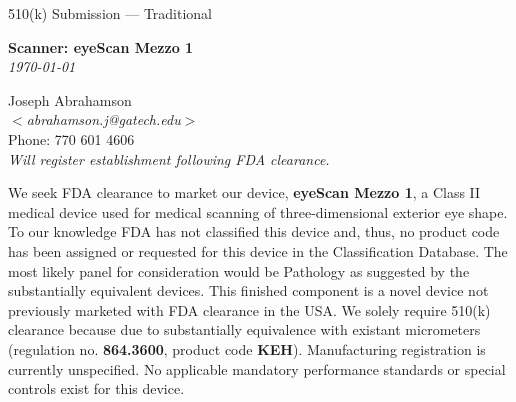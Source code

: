 \newpage
\singlespacing

\begin{flushright}
  \huge{510(k) Submission --- Traditional}\\[.5in]
  
  \begin{minipage}{0.8\textwidth}
    \begin{flushright}
      \large \textbf{Scanner: eyeScan Mezzo 1} \\
      \textit{\today}
    \end{flushright}
  \end{minipage}
\end{flushright}

\begin{flushleft}
  Joseph Abrahamson\\
  $<$\textit{abrahamson.j@gatech.edu}$>$ \\
  Phone: 770 601 4606 \\[1em]
  
  \textit{Will register establishment following FDA clearance.}
\end{flushleft}
\vspace{4em}

\onehalfspacing

We seek FDA clearance to market our device, \textbf{eyeScan Mezzo 1},
a Class II medical device used for medical scanning of
three-dimensional exterior eye shape. To our knowledge FDA has not
classified this device and, thus, no product code has been assigned or
requested for this device in the Classification Database. The most
likely panel for consideration would be Pathology as suggested by the
substantially equivalent devices. This finished component is a novel
device not previously marketed with FDA clearance in the USA. We
solely require 510(k) clearance because due to substantially
equivalence with existant micrometers (regulation
no. \textbf{864.3600}, product code \textbf{KEH}). Manufacturing
registration is currently unspecified. No applicable mandatory
performance standards or special controls exist for this device.

\newpage

